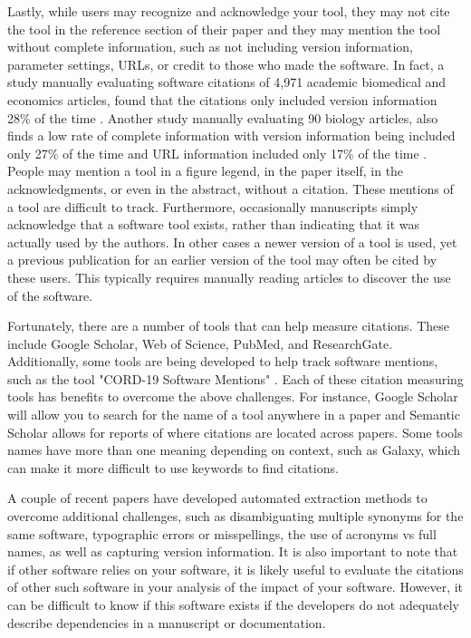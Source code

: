 \documentclass{article}
\begin{document}
Lastly, while users may recognize and acknowledge your tool, they may not cite the tool in the reference section of their paper and they may mention the tool without complete information, such as not including version information, parameter settings, URLs, or credit to those who made the software. In fact, a study manually evaluating software citations of 4,971 academic biomedical and economics articles, found that the citations only included version information  28\% of the time \cite{howison_software_2016}.  Another study manually evaluating 90 biology articles, also finds a low rate of complete information with version information being included only 27\% of the time and URL information included only 17\% of the time \cite{du_softcite_2021}. People may mention a tool in a figure legend, in the paper itself, in the acknowledgments, or even in the abstract, without a citation. These mentions of a tool are difficult to track. Furthermore, occasionally manuscripts simply acknowledge that a software tool exists, rather than indicating that it was actually used by the authors. In other cases a newer version of a tool is used, yet a previous publication for an earlier version of the tool may often be cited by these users. This typically requires manually reading articles to discover the use of the software. 

Fortunately, there are a number of tools that can help measure citations. These include Google Scholar, Web of Science, PubMed, and ResearchGate. Additionally, some tools are being developed to help track software mentions, such as the tool "CORD-19 Software Mentions" \cite{wade_cord-19_2021}. Each of these citation measuring tools has benefits to overcome the above challenges. For instance, Google Scholar will allow you to search for the name of a tool anywhere in a paper and Semantic Scholar allows for reports of where citations are located across papers. Some tools names have more than one meaning depending on context, such as Galaxy, which can make it more difficult to use keywords to find citations. 

A couple of recent papers \cite{istrate_large_2022, schindler_role_2022} have developed automated extraction methods to overcome additional challenges, such as disambiguating multiple synonyms for the same software, typographic errors or misspellings, the use of acronyms vs full names, as well as capturing version information. It is also important to note that if other software relies on your software, it is likely useful to evaluate the citations of other such software in your analysis of the impact of your software. However, it can be difficult to know if this software exists if the developers do not adequately describe dependencies in a manuscript or documentation.
\end{document}
